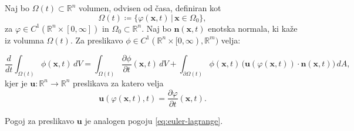 \documentclass[mat2, tisk]{fmfdelo}
\newcommand{\R}{\mathbb R}
\newcommand{\bd}{\textbf}
\begin{document}
\begin{izrek}
\label{transport}
Naj bo $\Omega(t) \subset \mathbb{R}^n$ volumen, odvisen od časa, 
definiran kot 
$$
\Omega(t) \coloneqq \{\varphi(\bd{x}, t) \,|\, \bd{x} \in \Omega_0\},
$$
za $\varphi \in C^1(\R^n \times [0, \infty])$ in $\Omega_0 \subset \R^n$.
Naj bo $\mathbf{n}(\mathbf{x},t)$ enotska normala, ki kaže iz volumna $\Omega(t)$.  
Za preslikavo $\phi \in C^1(\R^n \times [0, \infty), \R^m)$ velja:

\begin{equation}
\frac{d}{dt} \int_{\Omega(t)} \phi(\mathbf{x},t)\, dV
= \int_{\Omega(t)} \frac{\partial \phi}{\partial t}(\mathbf{x},t)\, dV
+ \int_{\partial \Omega(t)} \phi(\mathbf{x},t)\, \big(\bd{u}(\varphi(\bd{x}, t))\cdot \mathbf{n}(\mathbf{x},t)\big)\, dA,
\end{equation}
kjer je $\bd{u}:\R^n \rightarrow \R^n$ preslikava za katero velja 
\begin{equation}
\bd{u}(\varphi(\bd{x}, t), t) = \frac{\partial \varphi}{\partial t}(\bd{x}, t).
\end{equation}
\end{izrek}

\begin{opomba}
Pogoj za preslikavo $\bd{u}$ je analogen pogoju \eqref{eq:euler-lagrange}.
\end{opomba}
\end{document}
